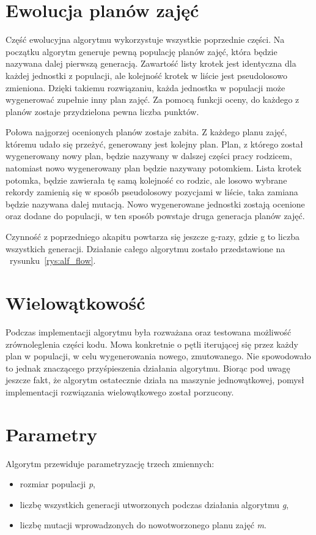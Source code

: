 \section{Ewolucja planów zajęć}

    Część ewolucyjna algorytmu wykorzystuje wszystkie poprzednie części. Na początku algorytm generuje pewną populację planów zajęć, która będzie nazywana dalej pierwszą generacją. Zawartość listy krotek jest identyczna dla każdej jednostki z populacji, ale kolejność krotek w liście jest pseudolosowo zmieniona. Dzięki takiemu rozwiązaniu, każda jednostka w populacji może wygenerować zupełnie inny plan zajęć. Za pomocą funkcji oceny, do każdego z planów zostaje przydzielona pewna liczba punktów. 

Połowa najgorzej ocenionych planów zostaje zabita. Z każdego planu zajęć, któremu udało się przeżyć, generowany jest kolejny plan. Plan, z którego został wygenerowany nowy plan, będzie nazywany w dalszej części pracy rodzicem, natomiast nowo wygenerowany plan będzie nazywany potomkiem. Lista krotek potomka, będzie zawierała tę samą kolejność co rodzic, ale losowo wybrane rekordy zamienią się w sposób pseudolosowy pozycjami w liście, taka zamiana będzie nazywana dalej mutacją. Nowo wygenerowane jednostki zostają ocenione oraz dodane do populacji, w ten sposób powstaje druga generacja planów zajęć.

    Czynność z poprzedniego akapitu powtarza się jeszcze g-razy, gdzie g to liczba wszystkich generacji. Działanie całego algorytmu zostało przedstawione na ~rysunku~\ref{rys:alf_flow}.


\section{Wielowątkowość}

Podczas implementacji algorytmu była rozważana oraz testowana możliwość zrównoleglenia części kodu. Mowa konkretnie o pętli iterującej się przez każdy plan w populacji, w celu wygenerowania nowego, zmutowanego. Nie spowodowało to jednak znaczącego przyśpieszenia działania algorytmu. Biorąc pod uwagę jeszcze fakt, że algorytm ostatecznie działa na maszynie jednowątkowej, pomysł implementacji rozwiązania wielowątkowego został porzucony.


\section{Parametry}
Algorytm przewiduje parametryzację trzech zmiennych:
\begin{itemize}
	\item rozmiar populacji \textit{p},
	\item liczbę wszystkich generacji utworzonych podczas działania algorytmu \textit{g},
	\item liczbę mutacji wprowadzonych do nowotworzonego planu zajęć \textit{m}.
\end{itemize}

